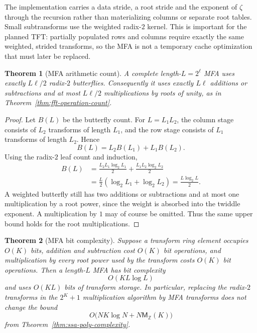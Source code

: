 \documentclass[11pt]{book}
\newtheorem{theorem}{Theorem}[section]
\theoremstyle{definition}
\newcommand{\ZZ}{\mathbb Z}
\newcommand{\MZ}{\mathsf M_{\ZZ}}
\begin{document}
The implementation carries a data stride, a root stride and the exponent of
$\zeta$ through the recursion rather than materializing columns or separate
root tables.  Small subtransforms use the weighted radix-$2$ kernel.  This is
important for the planned TFT: partially populated rows and columns require
exactly the same weighted, strided transforms, so the MFA is not a temporary
cache optimization that must later be replaced.

\begin{theorem}[MFA arithmetic count]\label{thm:mfa-operation-count}
A complete length-$L=2^\ell$ MFA uses exactly $L\ell/2$ radix-$2$
butterflies.  Consequently it uses exactly $L\ell$ additions or
subtractions and at most $L\ell/2$ multiplications by roots of unity, as in
Theorem~\ref{thm:fft-operation-count}.
\end{theorem}

\begin{proof}
Let $B(L)$ be the butterfly count.  For $L=L_1L_2$, the column stage consists
of $L_2$ transforms of length $L_1$, and the row stage consists of $L_1$
transforms of length $L_2$.  Hence
\[
 B(L)=L_2B(L_1)+L_1B(L_2).
\]
Using the radix-$2$ leaf count and induction,
\begin{align*}
 B(L)
 &=\frac{L_2L_1\log_2L_1}{2}
   +\frac{L_1L_2\log_2L_2}{2}\\
 &=\frac{L}{2}(\log_2L_1+\log_2L_2)
  =\frac{L\log_2L}{2}.
\end{align*}
A weighted butterfly still has two additions or subtractions and at most one
multiplication by a root power, since the weight is absorbed into the twiddle
exponent.  A multiplication by $1$ may of course be omitted.  Thus the same
upper bound holds for the root multiplications.
\end{proof}

\begin{theorem}[MFA bit complexity]\label{thm:mfa-bit-complexity}
Suppose a transform ring element occupies $O(K)$ bits, addition and
subtraction cost $O(K)$ bit operations, and multiplication by every root power
used by the transform costs $O(K)$ bit operations.  Then a length-$L$ MFA has
bit complexity
\begin{equation}\label{eq:mfa-bit-complexity}
 O(KL\log L)
\end{equation}
and uses $O(KL)$ bits of transform storage.  In particular, replacing the
radix-$2$ transforms in the $2^K+1$ multiplication algorithm by MFA transforms
does not change the bound
\[
 O\bigl(NK\log N+N\MZ(K)\bigr)
\]
from Theorem~\ref{thm:ssa-poly-complexity}.
\end{theorem}
\end{document}
